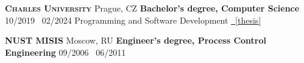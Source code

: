 
\vspace{1.0em}

\textsc{\textbf{Charles University}} \textsuperscript{\href{https://www.mff.cuni.cz/}{\faExternalLink*}}
\hfill Prague, CZ \newline
\textbf{Bachelor's degree, Computer Science}
\hfill 10/2019 \textendash\ 02/2024 \newline
Programming and Software Development
\hfill
\href{http://hdl.handle.net/20.500.11956/188286}{\faFilePdf[regular]~[thesis]}

\vspace{1.0em}

\textsc{\textbf{NUST MISIS}} \textsuperscript{\href{https://www.misis.ru/}{\faExternalLink*}}
\hfill Moscow, RU \newline
\textbf{Engineer's degree, Process Control Engineering}
\hfill 09/2006 \textendash\ 06/2011

\vspace{1.0em}
